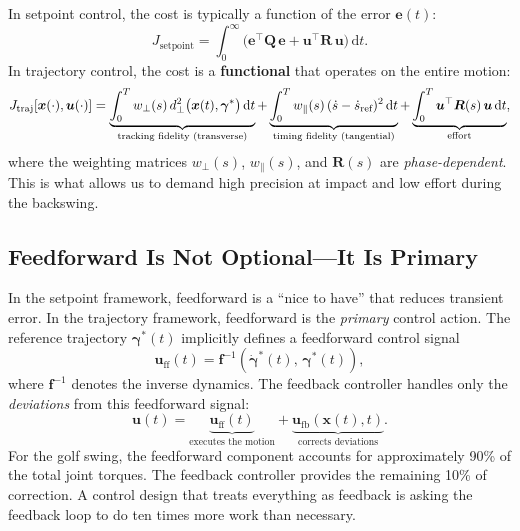 \documentclass[12pt, openany]{book}
\theoremstyle{plain}
\newcommand{\state}{\bm{x}}
\newcommand{\control}{\bm{u}}
\newcommand{\traj}{\bm{\gamma}}
\newcommand{\dd}{\mathrm{d}}
\newcommand{\dt}{\,\dd t}
\begin{document}
In setpoint control, the cost is typically a function of the error $\bm{e}(t)$:
\begin{equation}
  J_{\text{setpoint}} = \int_0^\infty \bigl(\bm{e}^\top \bm{Q}\, \bm{e}
  + \control^\top \bm{R}\, \control\bigr) \dt.
\end{equation}
In trajectory control, the cost is a \textbf{functional} that operates on the
entire motion:
\begin{equation}\label{eq:traj_cost}
  J_{\text{traj}}[\state(\cdot), \control(\cdot)] =
  \underbrace{\int_0^T w_\perp(s)\, d_\perp^2\bigl(\state(t), \traj^*\bigr) \dt}_{%
    \text{tracking fidelity (transverse)}}
  + \underbrace{\int_0^T w_\parallel(s)\, (\dot{s} - \dot{s}_{\text{ref}})^2 \dt}_{%
    \text{timing fidelity (tangential)}}
  + \underbrace{\int_0^T \control^\top \bm{R}(s)\, \control \dt}_{%
    \text{effort}},
\end{equation}
where the weighting matrices $w_\perp(s)$, $w_\parallel(s)$, and $\bm{R}(s)$ are
\emph{phase-dependent}. This is what allows us to demand high precision at impact
and low effort during the backswing.

\subsection{Feedforward Is Not Optional---It Is Primary}

In the setpoint framework, feedforward is a ``nice to have'' that reduces transient
error. In the trajectory framework, feedforward is the \emph{primary} control
action. The reference trajectory $\traj^*(t)$ implicitly defines a feedforward
control signal
\begin{equation}
  \control_{\text{ff}}(t) = \bm{f}^{-1}\!\left(\dot{\traj}^*(t),\, \traj^*(t)\right),
\end{equation}
where $\bm{f}^{-1}$ denotes the inverse dynamics. The feedback controller handles
only the \emph{deviations} from this feedforward signal:
\begin{equation}\label{eq:ff_fb_decomp}
  \control(t) = \underbrace{\control_{\text{ff}}(t)}_{\text{executes the motion}}
  + \underbrace{\control_{\text{fb}}(\state(t), t)}_{\text{corrects deviations}}.
\end{equation}
For the golf swing, the feedforward component accounts for approximately 90\% of
the total joint torques. The feedback controller provides the remaining 10\% of
correction. A control design that treats everything as feedback is asking the
feedback loop to do ten times more work than necessary.
\end{document}
